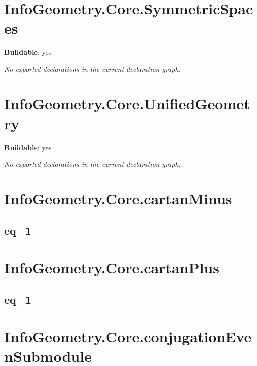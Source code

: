 \begin{theorem}[blueprint="infogeometry:core:symmetricspace:tolegacy_oflegacy"]
\end{theorem}

\section{InfoGeometry.Core.SymmetricSpaces}

\noindent\textbf{Buildable}: yes

\noindent\emph{No exported declarations in the current declaration graph.}

\section{InfoGeometry.Core.UnifiedGeometry}

\noindent\textbf{Buildable}: yes

\noindent\emph{No exported declarations in the current declaration graph.}

\section{InfoGeometry.Core.cartanMinus}

\subsection*{eq_1}

\begin{theorem}[blueprint="infogeometry:core:cartanminus:eq_1"]
\end{theorem}

\section{InfoGeometry.Core.cartanPlus}

\subsection*{eq_1}

\begin{theorem}[blueprint="infogeometry:core:cartanplus:eq_1"]
\end{theorem}

\section{InfoGeometry.Core.conjugationEvenSubmodule}

